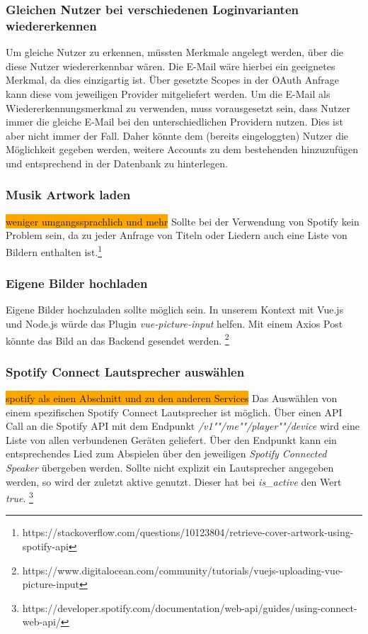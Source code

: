 \documentclass[10pt, a4paper]{article}
\begin{document}
\subsubsection{Gleichen Nutzer bei verschiedenen Loginvarianten wiedererkennen}
Um gleiche Nutzer zu erkennen, müssten Merkmale angelegt werden, über die diese Nutzer wiedererkennbar wären.
Die E-Mail wäre hierbei ein geeignetes Merkmal, da dies einzigartig ist. Über gesetzte Scopes in der OAuth Anfrage kann diese vom jeweiligen Provider mitgeliefert werden.
Um die E-Mail als Wiedererkennungsmerkmal zu verwenden, muss vorausgesetzt sein, dass Nutzer immer die gleiche E-Mail bei den unterschiedlichen Providern nutzen. Dies ist aber nicht immer der Fall.
Daher könnte dem (bereits eingeloggten) Nutzer die Möglichkeit gegeben werden, weitere Accounts zu dem bestehenden hinzuzufügen und entsprechend in der Datenbank zu hinterlegen.

\subsubsection{Musik Artwork laden}
\colorbox{orange}{weniger umgangssprachlich und mehr}
Sollte bei der Verwendung von Spotify kein Problem sein, da zu jeder Anfrage von Titeln oder Liedern auch eine Liste von Bildern enthalten ist.\footnote{https://stackoverflow.com/questions/10123804/retrieve-cover-artwork-using-spotify-api}

\subsubsection{Eigene Bilder hochladen}
Eigene Bilder hochzuladen sollte möglich sein. In unserem Kontext mit Vue.js und Node.js würde das Plugin \textit{vue-picture-input} helfen.
Mit einem Axios Post könnte das Bild an das Backend gesendet werden. \footnote{https://www.digitalocean.com/community/tutorials/vuejs-uploading-vue-picture-input}

\subsubsection{Spotify Connect Lautsprecher auswählen}
\colorbox{orange}{spotify als einen Abschnitt und zu den anderen Services}
Das Auswählen von einem spezifischen Spotify Connect Lautsprecher ist möglich.
Über einen API Call an die Spotify API mit dem Endpunkt \textit{/v1""/me""/player""/device} wird eine Liste von allen verbundenen Geräten geliefert. Über den Endpunkt kann ein entsprechendes Lied zum Abspielen über den jeweiligen \textit{Spotify Connected Speaker} übergeben werden.
Sollte nicht explizit ein Lautsprecher angegeben werden, so wird der zuletzt aktive genutzt. Dieser hat bei \textit{is\_active} den Wert \textit{true}. \footnote{https://developer.spotify.com/documentation/web-api/guides/using-connect-web-api/}
\end{document}
